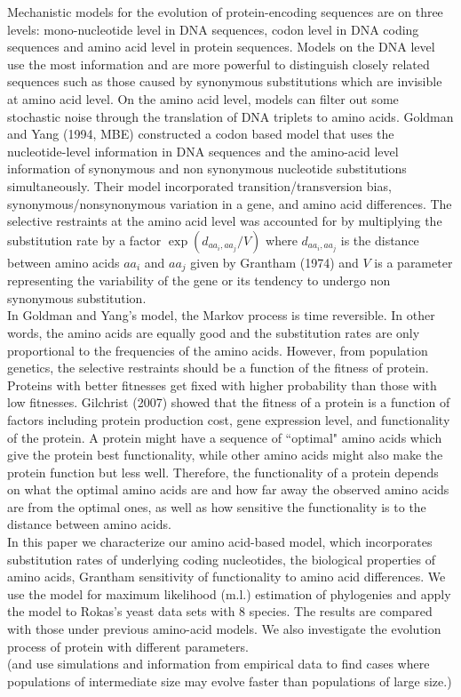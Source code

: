 \documentclass[13pt]{article}
\begin{document}
Mechanistic models for the evolution of protein-encoding sequences are on three levels: mono-nucleotide level in DNA sequences, codon level in DNA coding sequences and amino acid level in protein sequences. Models on the DNA level use the most information and are more powerful to distinguish closely related sequences such as those caused by synonymous substitutions which are invisible at amino acid level. On the amino acid level, models can filter out some stochastic noise through the translation of DNA triplets to amino acids. Goldman and Yang (1994, MBE) constructed a codon based model that uses the nucleotide-level information in DNA sequences and the amino-acid level information of synonymous and non synonymous nucleotide substitutions simultaneously. Their model incorporated transition/transversion bias, synonymous/nonsynonymous variation in a gene, and amino acid differences. The selective restraints at the amino acid level was accounted for by multiplying the substitution rate by a factor $\exp (d_{aa_i,aa_j}/V)$ where $d_{aa_i, aa_j}$ is the distance between amino acids $aa_i$ and $aa_j$ given by Grantham (1974) and $V$ is a parameter representing the variability of the gene or its tendency to undergo non synonymous substitution.\\

In Goldman and Yang's model, the Markov process is time reversible. In other words, the amino acids are equally good and the substitution rates are only proportional to the frequencies of the amino acids. However, from population genetics, the selective restraints should be a function of the fitness of protein. Proteins with better fitnesses get fixed with higher probability than those with low fitnesses. Gilchrist (2007) showed that the fitness of a protein is a function of factors including protein production cost, gene expression level, and functionality of the protein. A protein might have a sequence of ``optimal" amino acids which give the protein best functionality, while other amino acids might also make the protein function but less well. Therefore, the functionality of a protein depends on what the optimal amino acids are and how far away the observed amino acids are from the optimal ones, as well as how sensitive the functionality is to the distance between amino acids. \\

In this paper we characterize our amino acid-based model, which incorporates substitution rates of underlying coding nucleotides, the biological properties of amino acids, Grantham sensitivity of functionality to amino acid differences. We use the model for maximum likelihood (m.l.) estimation of phylogenies and apply the model to Rokas's yeast data sets with 8 species. The results are compared with those under previous amino-acid models. We also investigate the evolution process of protein with different parameters.\\
(and use simulations and information from empirical data to find cases where populations of intermediate size may evolve faster than populations of large size.)
\end{document}

